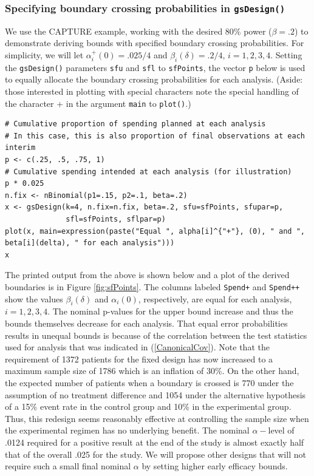 \subsubsection{Specifying boundary crossing probabilities in \texttt{gsDesign()}}

We use the CAPTURE example, working with the desired 80\% power ($\beta=.2$) to demonstrate deriving bounds with specified boundary crossing probabilities. 
For simplicity, we will let $\alpha_i^+(0)=.025/4$ and $\beta_i(\delta)=.2/4$, $i=1,2,3,4$. 
Setting the \texttt{gsDesign()} parameters \texttt{sfu} and \texttt{sfl} to \texttt{sfPoints}, the vector \texttt{p} below is used to equally allocate the boundary crossing probabilities for each analysis.
(Aside: those interested in plotting with special characters note the special handling of the character + in the argument \texttt{main} to \texttt{plot()}.) 
\bigskip

\begin{verbatim}
# Cumulative proportion of spending planned at each analysis
# In this case, this is also proportion of final observations at each interim
p <- c(.25, .5, .75, 1)
# Cumulative spending intended at each analysis (for illustration)
p * 0.025
n.fix <- nBinomial(p1=.15, p2=.1, beta=.2)
x <- gsDesign(k=4, n.fix=n.fix, beta=.2, sfu=sfPoints, sfupar=p,
              sfl=sfPoints, sflpar=p)
plot(x, main=expression(paste("Equal ", alpha[i]^{"+"}, (0), " and ", 
beta[i](delta), " for each analysis")))
x
\end{verbatim}
\bigskip

The printed output from the above is shown below and a plot of the derived boundaries is in Figure \ref{fig:sfPoints}. 
The columns labeled \texttt{Spend+} and \texttt{Spend++} show the values $\beta_i(\delta)$ and $\alpha_i(0)$, respectively, are equal for each analysis, $i=1,2,3,4$.
The nominal p-values for the upper bound increase and thus the bounds themselves decrease for each analysis.
That equal error probabilities results in unequal bounds is because of the correlation between the test statistics used for analysis that was indicated in (\ref{CanonicalCov}).
Note that the requirement of 1372 patients for the fixed design has now increased to a maximum sample size of 1786 which is an inflation of 30\%.
On the other hand, the expected number of patients when a boundary is crossed is 770 under the assumption of no treatment difference and 1054 under the alternative hypothesis of a 15\% event rate in the control group and 10\% in the experimental group.
Thus, this redesign seems reasonably effective at controlling the sample size when the experimental regimen has no underlying benefit.
The nominal $\alpha-$level of .0124 required for a positive result at the end of the study is almost exactly half that of the overall .025 for the study.
We will propose other designs that will not require such a small final nominal $\alpha$ by setting higher early efficacy bounds.
\bigskip

